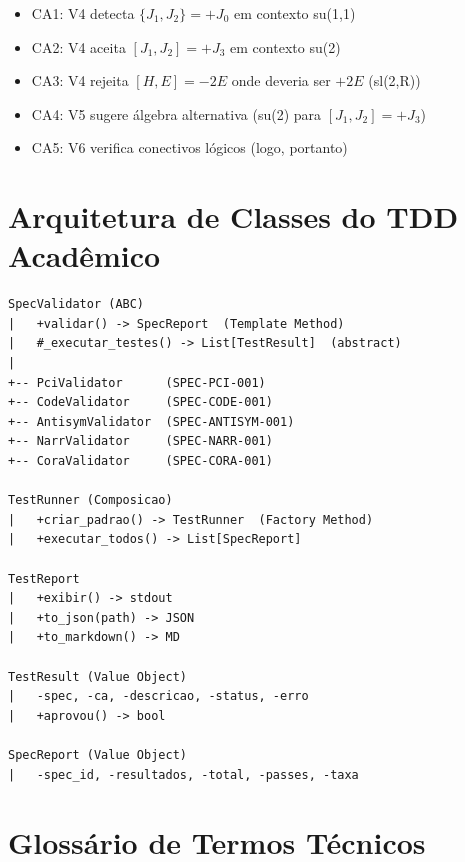 \documentclass[12pt,a4paper,sumario=tradicional]{abntex2}
\begin{document}
\begin{apendicesenv}
\begin{itemize}
    \item [+] CA1: V4 detecta $\{J_1,J_2\}=+J_0$ em contexto su(1,1)
    \item [+] CA2: V4 aceita $[J_1,J_2]=+J_3$ em contexto su(2)
    \item [+] CA3: V4 rejeita $[H,E]=-2E$ onde deveria ser $+2E$ (sl(2,R))
    \item [+] CA4: V5 sugere álgebra alternativa (su(2) para $[J_1,J_2]=+J_3$)
    \item [+] CA5: V6 verifica conectivos lógicos (logo, portanto)
\end{itemize}

\chapter{Arquitetura de Classes do TDD Acadêmico}

\begin{verbatim}
SpecValidator (ABC)
|   +validar() -> SpecReport  (Template Method)
|   #_executar_testes() -> List[TestResult]  (abstract)
|
+-- PciValidator      (SPEC-PCI-001)
+-- CodeValidator     (SPEC-CODE-001)
+-- AntisymValidator  (SPEC-ANTISYM-001)
+-- NarrValidator     (SPEC-NARR-001)
+-- CoraValidator     (SPEC-CORA-001)

TestRunner (Composicao)
|   +criar_padrao() -> TestRunner  (Factory Method)
|   +executar_todos() -> List[SpecReport]

TestReport
|   +exibir() -> stdout
|   +to_json(path) -> JSON
|   +to_markdown() -> MD

TestResult (Value Object)
|   -spec, -ca, -descricao, -status, -erro
|   +aprovou() -> bool

SpecReport (Value Object)
|   -spec_id, -resultados, -total, -passes, -taxa
\end{verbatim}

\chapter{Glossário de Termos Técnicos}


\end{apendicesenv}
\end{document}
